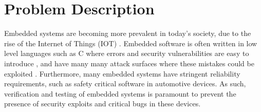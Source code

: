 \documentclass[11pt]{article}
\begin{document}







\section{Problem Description} \label{sec:1}

Embedded systems are becoming more prevalent in today's society, due to the
rise of the Internet of Things (IOT) \citep{Abdumohasan_2021}. Embedded
software is often written in low level languages such as C where errors and
security vulnerabilities are easy to introduce \citep{Svoboda_2021}, and have
many many attack surfaces where these mistakes could be exploited
\citep{Abdumohasan_2021}. Furthermore, many embedded systems have stringent
reliability requirements, such as safety critical software in automotive
devices. As such, verification and testing of embedded systems is paramount to
prevent the presence of security exploits and critical bugs in these devices.
\end{document}
